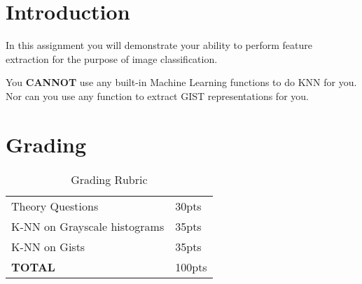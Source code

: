 \documentclass[12pt]{article}
\begin{document}
\maketitle


\section*{Introduction}
In this assignment you will demonstrate your ability to perform feature extraction for the purpose of image classification.

\noindent
You \textbf{CANNOT} use any built-in Machine Learning functions to do KNN for you.  Nor can you use any function to extract GIST representations for you.  


\section*{Grading}
\begin{table}[h]
\begin{centering}
\begin{tabular}{|l|l|}
\hline
Theory Questions & 30pts \\
K-NN on Grayscale histograms & 35pts\\
K-NN on Gists & 35pts \\
\hline
\textbf{TOTAL} & 100pts\\
\hline
\end{tabular}
\caption{Grading Rubric}
\end{centering}
\end{table}

\newpage
\end{document}
